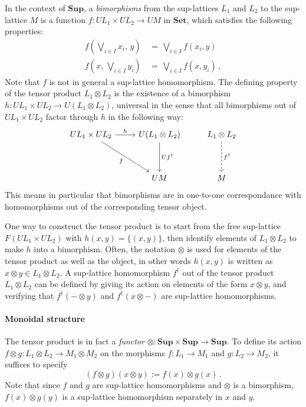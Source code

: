 \documentclass[11pt,oneside,draft]{book}
\theoremstyle{definition}
\begin{document}
In the context of $\mathbf{Sup}$,
a \emph{bimorphisms}
from the sup-lattices $L_1$ and $L_2$
to the sup-lattice $M$
is a function $f : U L_1 \times U L_2 \rightarrow U M$
in $\mathbf{Set}$,
which satisfies the following properties:
\begin{align*}
  f(\bigvee_{i \in I} x_i, \, y) \, &= \, \bigvee_{i \in I} f(x_i, y) \\
  f(x, \, \bigvee_{i \in I} y_i) \, &= \, \bigvee_{i \in I} f(x, y_i)
  \,,
\end{align*}
Note that $f$ is not in general
a sup-lattice homomorphism.
The defining property of the tensor product $L_1 \otimes L_2$
is the existence of a bimorphism
$h : U L_1 \times U L_2 \rightarrow U (L_1 \otimes L_2)$,
universal in the sense that all bimorphisms
out of $U L_1 \times U L_2$
factor through $h$ in the following way:
\begin{equation} \label{eqn:tensor}
  \begin{tikzcd}[row sep=huge]
    U L_1 \times U L_2 \ar[r, "h"] \ar[dr, "f"'] &
    U (L_1 \otimes L_2) \ar[d, "U f^\dagger"] &
    L_1 \otimes L_2 \ar[d, "f^\dagger", dashed] \\
    & U M & M
  \end{tikzcd}
\end{equation}
This means in particular that
bimorphisms are in one-to-one correspondance with
homomorphisms out of the corresponding tensor object.

One way to construct the tensor product
is to start from the free sup-lattice $F (U L_1 \times U L_2)$
with $h(x, y) = \{ (x, y) \}$,
then identify elements of $L_1 \otimes L_2$
to make $h$ into a bimorphism.
Often, the notation $\otimes$ is used for elements
of the tensor product as well as the object,
in other words $h(x, y)$ is written as
$x \otimes y \in L_1 \otimes L_2$.
A sup-lattice homomorphism $f^\dagger$
out of the tensor product $L_1 \otimes L_2$
can be defined by giving its action on
elements of the form $x \otimes y$,
and verifying that
$f^\dagger(- \otimes y)$ and
$f^\dagger(x \otimes -)$ 
are sup-lattice homomorphisms.


\paragraph{Monoidal structure}

The tensor product is in fact a \emph{functor}
${\otimes} :
 \mathbf{Sup} \times \mathbf{Sup} \rightarrow \mathbf{Sup}$.
To define its action
$f \otimes g : L_1 \otimes L_2 \rightarrow M_1 \otimes M_2$
on the morphisms
$f : L_1 \rightarrow M_1$ and
$g : L_2 \rightarrow M_2$,
it suffices to specify
\[
  (f \otimes g)(x \otimes y) := f(x) \otimes g(x)
  \,.
\]
Note that since $f$ and $g$ are sup-lattice homomorphisms
and $\otimes$ is a bimorphism,
$f(x) \otimes g(y)$
is a sup-lattice homomorphism separately in $x$ and $y$.
\end{document}

